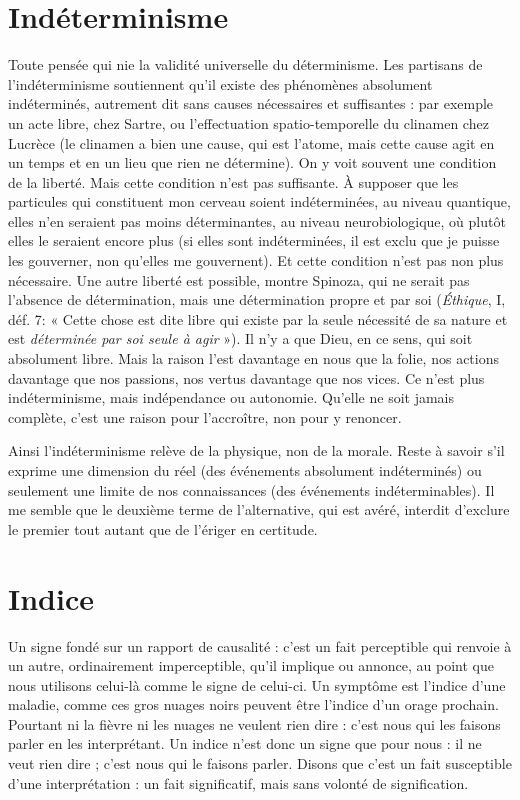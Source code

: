 \section{Indéterminisme}
Toute pensée qui nie la validité universelle du déterminisme.
Les partisans de l’indéterminisme soutiennent
qu’il existe des phénomènes absolument indéterminés, autrement dit sans
causes nécessaires et suffisantes : par exemple un acte libre, chez Sartre, ou
l’effectuation spatio-temporelle du clinamen chez Lucrèce (le clinamen a bien
une cause, qui est l’atome, mais cette cause agit en un temps et en un lieu que
rien ne détermine). On y voit souvent une condition de la liberté. Mais cette
condition n’est pas suffisante. À supposer que les particules qui constituent
mon cerveau soient indéterminées, au niveau quantique, elles n’en seraient pas
moins déterminantes, au niveau neurobiologique, où plutôt elles le seraient
encore plus (si elles sont indéterminées, il est exclu que je puisse les gouverner,
non qu’elles me gouvernent). Et cette condition n’est pas non plus nécessaire.
Une autre liberté est possible, montre Spinoza, qui ne serait pas l’absence de
détermination, mais une détermination propre et par soi ({\it Éthique}, I, déf. 7:
« Cette chose est dite libre qui existe par la seule nécessité de sa nature et est
{\it déterminée par soi seule à agir} »). Il n’y a que Dieu, en ce sens, qui soit absolument
libre. Mais la raison l’est davantage en nous que la folie, nos actions
davantage que nos passions, nos vertus davantage que nos vices. Ce n’est plus
indéterminisme, mais indépendance ou autonomie. Qu'elle ne soit jamais
complète, c’est une raison pour l’accroître, non pour y renoncer.

Ainsi l’indéterminisme relève de la physique, non de la morale. Reste à
savoir s’il exprime une dimension du réel (des événements absolument indéterminés)
ou seulement une limite de nos connaissances (des événements indéterminables).
Il me semble que le deuxième terme de l’alternative, qui est avéré,
interdit d’exclure le premier tout autant que de l’ériger en certitude.

\section{Indice}
Un signe fondé sur un rapport de causalité : c’est un fait perceptible
qui renvoie à un autre, ordinairement imperceptible, qu’il
implique ou annonce, au point que nous utilisons celui-là comme le signe de
celui-ci. Un symptôme est l'indice d’une maladie, comme ces gros nuages noirs
peuvent être l’indice d’un orage prochain. Pourtant ni la fièvre ni les nuages ne
veulent rien dire : c’est nous qui les faisons parler en les interprétant. Un indice
n’est donc un signe que pour nous : il ne veut rien dire ; c’est nous qui le faisons
parler. Disons que c’est un fait susceptible d’une interprétation : un fait
significatif, mais sans volonté de signification.

